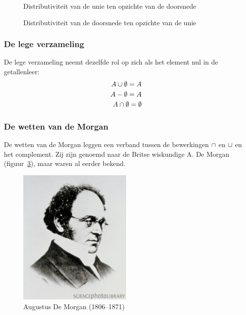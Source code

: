 \begin{figure}[htbp]
\centering
{}\qquad
{}
\caption{Distributiviteit van de unie ten opzichte van de doorsnede}
\label{fig:distr1}
\end{figure}

\begin{figure}
\centering
{}\qquad
{}
\caption{Distributiviteit van de doorsnede ten opzichte van de unie}
\label{fig:distr2}
\end{figure}

\subsubsection{De lege verzameling}
De lege verzameling neemt dezelfde rol op zich als het element nul in de getallenleer:
\begin{equation*}
\begin{split}
A\cup \emptyset=A \\
A-\emptyset=A\\
A\cap\emptyset=\emptyset 
\end{split}
\end{equation*}

\subsubsection{De wetten van de Morgan}
De wetten van de Morgan leggen een verband tussen de 
bewerkingen $\cap$ en $\cup$ en het complement. 
Zij zijn genoemd naar de Britse wiskundige A. De Morgan 
(figuur~\ref{fig:morgan}), maar waren al eerder bekend.
\begin{figure}[htbp]
\centering
\includegraphics[width=0.5\textwidth]{figuren/verzamelingen_relaties/AugustusDeMorgan}
\caption{Augustus De Morgan (1806--1871)}
\label{fig:morgan}
\end{figure}

